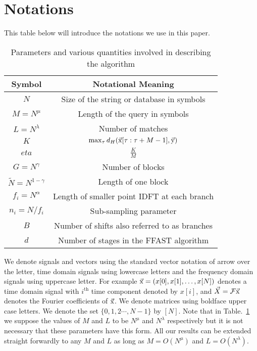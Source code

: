 \section{Notations}

This table below will introduce the notations we use in this paper.
\begin{table}[h!]
\label{Table:Notations}
\caption{Parameters and various quantities involved in describing the algorithm}
\begin{center}
	\begin{tabular}{|c|c|}		
		\hline		
		Symbol				        &  Notational Meaning \\		
		\hline
		$N$           				& Size of the string or database in symbols \\
		\hline
		$M = N^{\mu}$       & Length of the query in symbols \\
		\hline
        $L = N^\lambda$    &   Number of matches \\
        \hline
        $K$             &$\max_{\tau}d_{H}(\vec{\mathrm{x}}[\tau:\tau+M-1],\vec{\mathrm{y}})$\\
        \hline
	    $eta$             &$\frac{K}{M}$\\
		$G = N^\gamma$    & Number of blocks \\
		\hline
		$\tilde{N} = N^{1-\gamma}$   & Length of one block \\
		\hline
		$f_i = N^\alpha$     & Length of smaller point IDFT at each branch\\
		\hline
		$n_i = N/f_i$     	   &  Sub-sampling parameter \\
		\hline
		$B$   					    & Number of shifts also referred to as branches  \\
		\hline
		$d$           				& Number of stages in the FFAST algorithm \\
		\hline
	\end{tabular}
\end{center}	
\end{table}	
We denote signals and vectors using the standard vector notation of arrow over the letter, time domain signals using lowercase letters and the frequency domain signals using uppercase letter. For example $\vec{\mathrm{x}} = (x[0], x[1], \ldots, x[N] )$ denotes a time domain signal with $i^{\text{th}}$ time component denoted by $x[i]$, and $\vec{X}= \mathcal{F}\vec{\mathrm{x}}$ denotes the Fourier coefficients of $\vec{\mathrm{x}}$. We denote matrices using boldface upper case letters. We denote the set $\{0,1,2\cdots, N-1\}$ by $[N]$. Note that in Table.~\ref{Table:Notations} we suppose the values of $M$ and $L$ to be $N^{\mu}$ and $N^{\lambda}$ respectively but it is not necessary that these parameters have this form. All our results can be extended straight forwardly to any $M$ and $L$ as long as $M=O(N^{\mu})$ and $L=O(N^{\lambda})$.
	
	

